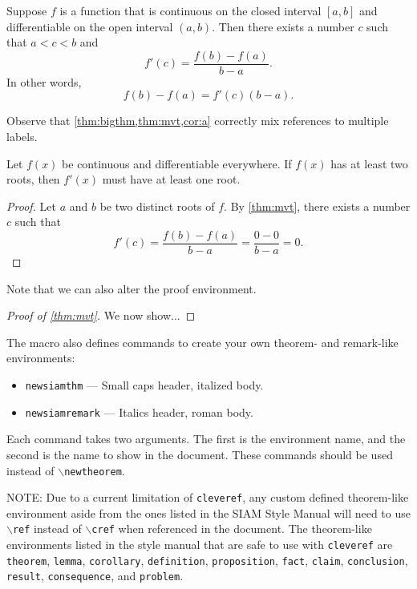 \documentclass[twoside,leqno]{article}
\begin{document}
\begin{theorem}\label{thm:mvt}
  Suppose $f$ is a function that is continuous on the closed interval
  $[a,b]$ and differentiable on the open interval $(a,b)$.
  Then there exists a number $c$ such that $a < c < b$ and
  \begin{displaymath}
    f'(c) = \frac{f(b)-f(a)}{b-a}.
  \end{displaymath}
  In other words,
  \begin{displaymath}
    f(b)-f(a) = f'(c)(b-a).
  \end{displaymath}
\end{theorem}

Observe that \cref{thm:bigthm,thm:mvt,cor:a} correctly mix references
to multiple labels.

\begin{corollary}\label{cor:a}
  Let $f(x)$ be continuous and differentiable everywhere. If $f(x)$
  has at least two roots, then $f'(x)$ must have at least one root.
\end{corollary}
\begin{proof}
  Let $a$ and $b$ be two distinct roots of $f$.
  By \cref{thm:mvt}, there exists a number $c$ such that
  \begin{displaymath}
    f'(c) = \frac{f(b)-f(a)}{b-a} = \frac{0-0}{b-a} = 0.
  \end{displaymath}
\end{proof}
Note that we can also alter the proof environment.
\begin{proof}[Proof of \cref{thm:mvt}]
We now show...
\end{proof}

The macro also defines commands to create your own theorem- and
remark-like environments:
\begin{itemize}[nosep]
\item \texttt{newsiamthm} --- Small caps header, italized body. 
\item \texttt{newsiamremark} --- Italics header, roman body.
\end{itemize}
Each command takes two arguments. The first is the environment name,
and the second is the name to show in the document. These commands should
be used instead of $\backslash$\texttt{newtheorem}.

NOTE: Due to a current limitation of \texttt{cleveref}, any custom defined theorem-like environment 
aside from the ones listed in the SIAM Style Manual \cite[Chapter 6]{siam} will need to use $\backslash$\texttt{ref} 
instead of $\backslash$\texttt{cref} when referenced in the document.  The theorem-like
environments listed in the style manual that are safe to use with \texttt{cleveref} are 
\texttt{theorem}, 
\texttt{lemma}, 
\texttt{corollary},
\texttt{definition},
\texttt{proposition},
\texttt{fact}, 
\texttt{claim}, 
\texttt{conclusion},
\texttt{result}, 
\texttt{consequence}, and
\texttt{problem}.
\end{document}
